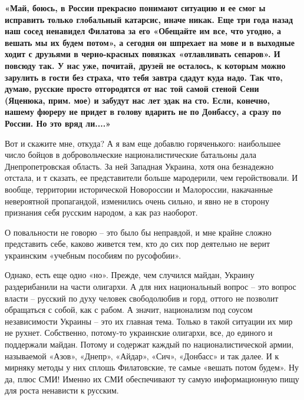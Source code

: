 \begin{zzquote}
\bfseries\large\color{magenta}
«Май, боюсь, в России прекрасно понимают ситуацию и ее смог ы исправить только
глобальный катарсис, иначе никак. Еще три года назад наш сосед ненавидел
Филатова за его «Обещайте им все, что угодно, а вешать мы их будем потом», а
сегодня он шпрехает на мове и в выходные ходит с друзьями в черно-красных
повязках «отлавливать сепаров». И повсюду так. У нас уже, почитай, друзей не
осталось, к которым можно зарулить в гости без страха, что тебя завтра сдадут
куда надо. Так что, думаю, русские просто отгородятся от нас той самой стеной
Сени (Яценюка, прим. мое) и забудут нас лет эдак на сто. Если, конечно, нашему
фюреру не придет в голову вдарить не по Донбассу, а сразу по России. Но это
вряд ли....»	
\end{zzquote}

Вот и скажите мне, откуда? А я вам еще добавлю горяченького: наибольшее число
бойцов в добровольческие националистические батальоны дала Днепропетровская
область. За ней Западная Украина, хотя она безнадежно отстала, и т сказать, ее
представители больше мародерили, чем геройствовали. И вообще, территории
исторической Новороссии и Малороссии, накачанные невероятной пропагандой,
изменились очень сильно, и явно не в сторону признания себя русским народом, а
как раз наоборот.

О повальности не говорю – это было бы неправдой, и мне крайне сложно
представить себе, каково живется тем, кто до сих пор деятельно не верит
украинским «учебным пособиям по русофобии».


Однако, есть еще одно «но». Прежде, чем случился майдан, Украину раздерибанили
на части олигархи. А для них национальный вопрос – это вопрос власти – русский
по духу человек свободолюбив и горд, оттого не позволит обращаться с собой, как
с рабом. А значит, национализм под соусом независимости Украины – это их
главная тема. Только в такой ситуации их мир не рухнет. Собственно, потому-то
украинские олигархи, все, до единого и поддержали майдан. Потому и содержат
каждый по националистической армии, называемой «Азов», «Днепр», «Айдар», «Сич»,
«Донбасс» и так далее. И к мирняку методы у них сплошь Филатовские, те самые
«вешать потом будем». Ну да, плюс СМИ! Именно их СМИ обеспечивают ту самую
информационную пищу для роста ненависти к русским.


